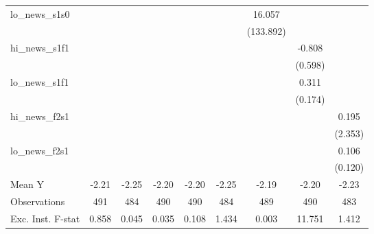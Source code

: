 {\begin{tabular}{l*{8}{c}}
\addlinespace
lo\_news\_s1s0&                     &                     &                     &                     &                     &      16.057         &                     &                     \\
            &                     &                     &                     &                     &                     &   (133.892)         &                     &                     \\
\addlinespace
hi\_news\_s1f1&                     &                     &                     &                     &                     &                     &      -0.808         &                     \\
            &                     &                     &                     &                     &                     &                     &     (0.598)         &                     \\
\addlinespace
lo\_news\_s1f1&                     &                     &                     &                     &                     &                     &       0.311\sym{*}  &                     \\
            &                     &                     &                     &                     &                     &                     &     (0.174)         &                     \\
\addlinespace
hi\_news\_f2s1&                     &                     &                     &                     &                     &                     &                     &       0.195         \\
            &                     &                     &                     &                     &                     &                     &                     &     (2.353)         \\
\addlinespace
lo\_news\_f2s1&                     &                     &                     &                     &                     &                     &                     &       0.106         \\
            &                     &                     &                     &                     &                     &                     &                     &     (0.120)         \\
\midrule
Mean Y      &       -2.21         &       -2.25         &       -2.20         &       -2.20         &       -2.25         &       -2.19         &       -2.20         &       -2.23         \\
Observations&         491         &         484         &         490         &         490         &         484         &         489         &         490         &         483         \\
Exc. Inst. F-stat&       0.858         &       0.045         &       0.035         &       0.108         &       1.434         &       0.003         &      11.751         &       1.412         \\
\bottomrule
\end{tabular}
}
